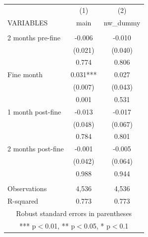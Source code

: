 \begin{tabular}{lcc} \hline
 & (1) & (2) \\
VARIABLES & main & nw\_dummy \\ \hline
 &  &  \\
2 months pre-fine & -0.006 & -0.010 \\
 & (0.021) & (0.040) \\
 & 0.774 & 0.806 \\
Fine month & 0.031*** & 0.027 \\
 & (0.007) & (0.043) \\
 & 0.001 & 0.531 \\
1 month post-fine & -0.013 & -0.017 \\
 & (0.048) & (0.067) \\
 & 0.784 & 0.801 \\
2 months post-fine & -0.001 & -0.005 \\
 & (0.042) & (0.064) \\
 & 0.988 & 0.944 \\
 &  &  \\
Observations & 4,536 & 4,536 \\
 R-squared & 0.773 & 0.773 \\ \hline
\multicolumn{3}{c}{ Robust standard errors in parentheses} \\
\multicolumn{3}{c}{ *** p$<$0.01, ** p$<$0.05, * p$<$0.1} \\
\end{tabular}

